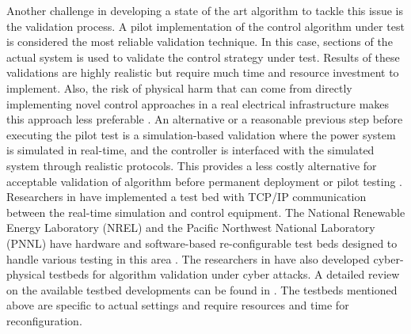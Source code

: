 Another challenge in developing a state of the art algorithm to tackle this issue is the validation process. A pilot implementation of the control algorithm under test is considered the most reliable validation technique. In this case, sections of the actual system is used to validate the control strategy under test. Results of these validations are highly realistic but require much time and resource investment to implement. Also, the risk of physical harm that can come from directly implementing novel control approaches in a real electrical infrastructure makes this approach less preferable \cite{TB_1}. An alternative or a reasonable previous step before executing the pilot test is a simulation-based validation where the power system is simulated in real-time, and the controller is interfaced with the simulated system through realistic protocols. This provides a less costly alternative for acceptable validation of algorithm before permanent deployment or pilot testing \cite{TB_1}. Researchers in \cite{TB_2} have implemented a test bed with TCP/IP communication between the real-time simulation and control equipment. The National Renewable Energy Laboratory (NREL) and the Pacific Northwest National Laboratory (PNNL) have hardware and software-based re-configurable test beds designed to handle various testing in this area \cite{NREL_DER_TEST, VOLTRON}. The researchers in \cite{TB_3, TB_5} have also developed cyber-physical testbeds for algorithm validation under cyber attacks. A detailed review on the available testbed developments can be found in \cite{TB_ALL}. The testbeds mentioned above are specific to actual settings and require resources and time for reconfiguration. 

